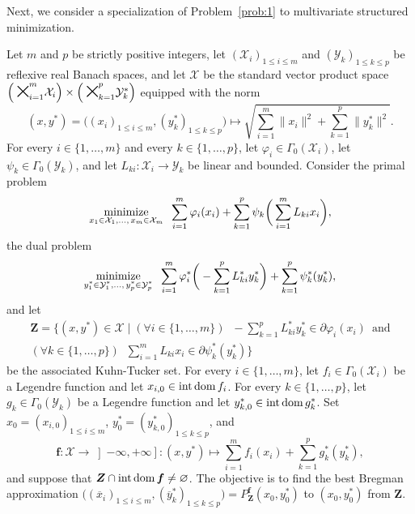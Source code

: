 \documentclass[a4paper,11pt,fleqn]{article}
\renewcommand{\leq}{\ensuremath{\leqslant}}
\newcommand{\minimize}[2]{\ensuremath{\underset{\substack{{#1}}}%
{\text{\rm minimize}}\;\;#2 }}
\newcommand{\RX}{\ensuremath{\left]-\infty,+\infty\right]}}
\newcommand{\XX}{\ensuremath{{\mathcal X}}}
\newcommand{\YY}{\ensuremath{{\mathcal Y}}}
\newcommand{\emp}{\ensuremath{{\varnothing}}}
\newcommand{\dom}{\ensuremath{\text{\rm dom}\,}}
\newcommand{\Cart}{\ensuremath{\raisebox{-0.5mm}{\mbox{\huge{$\times$}}}}}
\newcommand{\inte}{\ensuremath{\text{\rm int}\,}}
\theoremstyle{plain}{\theorembodyfont{\rmfamily}%
\newtheorem{conjecture}[theorem]{Conjecture}}
\theoremstyle{plain}{\theorembodyfont{\rmfamily}%
\newtheorem{example}[theorem]{Example}}
\theoremstyle{plain}{\theorembodyfont{\rmfamily}%
\newtheorem{remark}[theorem]{Remark}}
\theoremstyle{plain}{\theorembodyfont{\rmfamily}%
\newtheorem{algorithm}[theorem]{Algorithm}}
\theoremstyle{plain}{\theorembodyfont{\rmfamily}%
\newtheorem{condition}[theorem]{Condition}}
\theoremstyle{plain}{\theorembodyfont{\rmfamily}%
\newtheorem{definition}[theorem]{Definition}}
\theoremstyle{plain}{\theorembodyfont{\rmfamily}
\newtheorem{problem}[theorem]{Problem}}
\theoremstyle{plain}{\theorembodyfont{\rmfamily}
\newtheorem{notation}[theorem]{Notation}}
\numberwithin{equation}{section}
\begin{document}
Next, we consider a specialization of Problem~\ref{prob:1} to
multivariate structured minimization.

\begin{problem}
\label{IVpb:V3}
Let $m$ and $p$ be strictly positive integers, let
$(\XX_i)_{1\leq i\leq m}$ and $(\YY_k)_{1\leq k\leq p}$ be 
reflexive real Banach spaces, and let 
$\boldsymbol{\XX}$ be the standard vector product space 
$\Big(\Cart_{\!\!i=1}^{\!\!m}\XX_i\Big)\times
\Big(\Cart_{\!\!k=1}^{\!\!p}\YY_k^*\Big)$ 
equipped with the norm 
\begin{equation}
(x,y^*)=\big((x_i)_{1\leq i\leq m},(y_k^*)_{1\leq k\leq p}\big)
\mapsto\sqrt{\sum_{i=1}^m\|x_i\|^2+\sum_{k=1}^p\|y_k^*\|^2}.
\end{equation} 
For every $i\in\{1,\ldots,m\}$ and every $k\in\{1,\ldots,p\}$, 
let $\varphi_i\in\Gamma_0(\XX_i)$, let $\psi_k\in\Gamma_0(\YY_k)$,
and let $L_{ki}\colon\XX_i\to\YY_k$ be linear and bounded. 
Consider the primal problem 
\begin{equation}
\label{4eKKnhf74g201}
\minimize{x_1\in\XX_1,\ldots,\,x_m\in\XX_m}{\sum_{i=1}^m
\varphi_i(x_i)+\sum_{k=1}^p 
\psi_k\bigg(\sum_{i=1}^mL_{ki}x_i\bigg)},
\end{equation}
the dual problem
\begin{equation}
\label{4eKKnhf74g202}
\minimize{y^*_1\in\YY_1^*,\ldots,\,y^*_p\in\YY_p^*}{\sum_{i=1}^m
\varphi_i^*\bigg(-\sum_{k=1}^pL_{ki}^*y^*_k\bigg)
+\sum_{k=1}^p\psi^*_k(y^*_k)}, 
\end{equation}
and let 
\begin{multline}
\boldsymbol{Z}=\bigg\{({x},{y}^*)
\in\boldsymbol{\mathcal{X}}\;\bigg |\;
(\forall i\in\{1,\ldots,m\})\;\;-\sum_{k=1}^pL_{ki}^*y_k^*
\in\partial\varphi_i(x_i)\:\;\text{and}\\
(\forall k\in\{1,\ldots,p\})\;\;\sum_{i=1}^mL_{ki}x_i\in
\partial\psi_k^*(y_k^*)\bigg\}
\end{multline}
be the associated Kuhn-Tucker set. For every $i\in\{1,\ldots,m\}$,
let $f_i\in\Gamma_0(\XX_i)$ be a Legendre function and let
$x_{i,0}\in\inte\dom f_i$. For every $k\in\{1,\ldots,p\}$, 
let $g_k\in\Gamma_0(\YY_k)$ be a Legendre function and let
$y^*_{k,0}\in\inte\dom g^*_k$. Set
${x}_0=(x_{i,0})_{1\leq i\leq m}$, 
${y}_0^*=(y_{k,0}^*)_{1\leq k\leq p}$, and 
\begin{equation}
\boldsymbol{f}\colon\boldsymbol{\XX}\to\RX\colon
({x},{y}^*)\mapsto
\sum_{i=1}^mf_i(x_i)+\sum_{k=1}^pg_k^*(y_k^*),
\end{equation}
and suppose that 
$\boldsymbol{Z}\cap\inte\dom\boldsymbol{f}\neq\emp$. 
The objective is to find the best Bregman approximation 
$\big((\overline{x}_i)_{1\leq i\leq m},
(\overline{y}_k^*)_{1\leq k\leq p}\big)
=P_{\boldsymbol{Z}}^{\boldsymbol{f}} ({x}_0,{y}_0^*)$ 
to $({x}_0,{y}_0^*)$ from $\boldsymbol{Z}$.
\end{problem}
\end{document}
